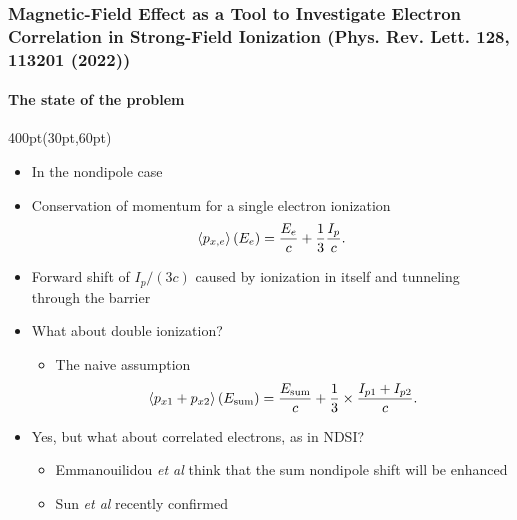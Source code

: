 \begin{frame}
%

\end{frame}



\begin{frame}
\frametitle{Magnetic-Field Effect as a Tool to Investigate 
Electron Correlation in Strong-Field Ionization
\small (Phys. Rev. Lett. 128, 113201 (2022))}
\framesubtitle{The state of the problem}

\small
\begin{textblock*}{400pt}(30pt,60pt)
\begin{itemize}
\item In the nondipole case
\item Conservation of momentum for a single electron ionization
\begin{align}
\footnotesize
\left\langle p_{x,e} \right\rangle (E_e)
 = \frac{E_e}{c} + \frac{1}{3}\frac{I_p}{c}. \nonumber
\end{align}
\item Forward shift of $I_p/(3c)$ caused by ionization in itself 
and tunneling through the barrier
\item What about double ionization?
\begin{itemize}
 \footnotesize
 \item[$\bullet$] The naive assumption
 $$ 
   \left\langle p_{x1} + p_{x2} \right\rangle (E_{\rm sum})= 
      \frac{E_{\rm sum}}{c} + \frac{1}{3}\times \frac{I_{p1} + I_{p2}}{c}.
 $$
\end{itemize}
 \item Yes, but what about correlated electrons, as in NDSI? %
\begin{itemize}
 \footnotesize
 \item[$\bullet$] Emmanouilidou \textit{et al} think that the sum 
nondipole shift will be enhanced
 \item[$\bullet$] Sun \textit{et al} recently confirmed
\end{itemize}
\end{itemize}


\end{textblock*}
\end{frame}
